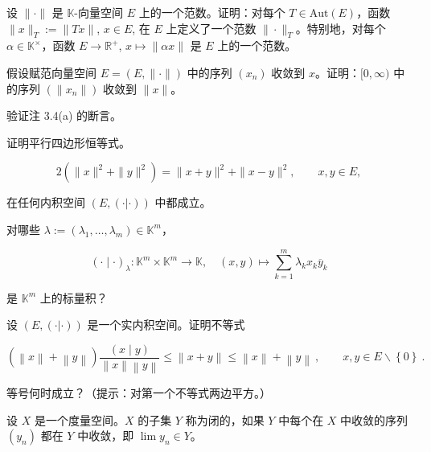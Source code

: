 \exerciseshead

\begin{exercises}
\item

设 $ \|\cdot\| $ 是 $ \mathbb{K} $-向量空间 $ E $ 上的一个范数。证明：对每个 $ T \in \text{Aut}(E) $，函数 $ \|x\|_T := \|Tx\| $,  $ x \in E $, 在 $ E $ 上定义了一个范数 $ \|\cdot\|_T $。特别地，对每个 $ \alpha \in \mathbb{K}^\times $，函数 $ E \to \mathbb{R}^+ $,  $ x \mapsto \|\alpha x\| $ 是 $ E $ 上的一个范数。

\item

假设赋范向量空间 $ E = (E, \|\cdot\|) $ 中的序列 $ (x_n) $ 收敛到 $ x $。证明：$ [0, \infty) $ 中的序列 $ (\|x_n\|) $ 收敛到 $ \|x\| $。

\item

验证注 3.4(a) 的断言。

\item

证明平行四边形恒等式。

\[
2(\|x\|^{2}+\|y\|^{2})=\|x+y\|^{2}+\|x-y\|^{2},\qquad x,y\in E,
\]

在任何内积空间 $ (E, (\cdot|\cdot)) $ 中都成立。

\item

对哪些 $ \lambda := (\lambda_1, \ldots, \lambda_m) \in \mathbb{K}^m $，

\[
\left(\cdot\mid\cdot\right)_{\lambda}:\mathbb{K}^{m}\times\mathbb{K}^{m}\to\mathbb{K},\quad(x,y)\mapsto\sum_{k=1}^{m}\lambda_{k}x_{k}\overline{y}_{k}
\]

是 $ \mathbb{K}^{m} $ 上的标量积？

\item

设 $ (E, (\cdot|\cdot)) $ 是一个实内积空间。证明不等式

\[
\left(\left\|x\right\|+\left\|y\right\|\right)\frac{\left(x\mid y\right)}{\left\|x\right\|\left\|y\right\|}\leq\left\|x+y\right\|\leq\left\|x\right\|+\left\|y\right\|~,\qquad x,y\in E\backslash\left\{0\right\}~.
\]

等号何时成立？（提示：对第一个不等式两边平方。）

\item

设 $X$ 是一个度量空间。$X$ 的子集 $Y$ 称为闭的，如果 $Y$ 中每个在 $X$ 中收敛的序列 $(y_n)$ 都在 $Y$ 中收敛，即 $\lim y_n \in Y$。

\end{exercises}

